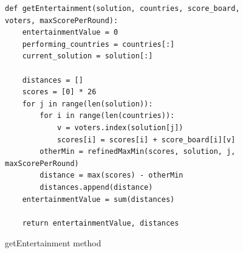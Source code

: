 \documentclass[12pt]{report}
\begin{document}
\begin{figure}[H]
\caption{getEntertainment method}
\label{getEntertainment}
\begin{lstlisting}
def getEntertainment(solution, countries, score_board, voters, maxScorePerRound):
    entertainmentValue = 0
    performing_countries = countries[:]
    current_solution = solution[:]
    
    distances = []
    scores = [0] * 26
    for j in range(len(solution)):
        for i in range(len(countries)):
            v = voters.index(solution[j])
            scores[i] = scores[i] + score_board[i][v]
        otherMin = refinedMaxMin(scores, solution, j, maxScorePerRound)
        distance = max(scores) - otherMin
        distances.append(distance)
    entertainmentValue = sum(distances)
    
    return entertainmentValue, distances
\end{lstlisting}
\end{figure}
\end{document}
